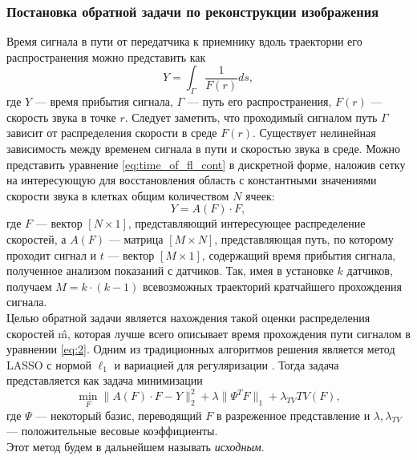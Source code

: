 \documentclass[14pt]{matmex-diploma-custom}
\begin{document}
\subsubsection*{Постановка обратной задачи по реконструкции изображения}
Время сигнала в пути от передатчика к приемнику вдоль траектории его распространения можно представить как
\begin{equation}\label{eq:time_of_fl_cont}
Y = \int_\Gamma \frac{1}{F(r)}ds,
\end{equation}
где $Y$ --- время прибытия сигнала, $\Gamma$ --- путь его распространения, $F(r)$ --- скорость звука в точке $r$. Следует заметить, что проходимый сигналом путь $\Gamma$ зависит от распределения скорости в среде $F(r)$. Существует нелинейная зависимость между временем сигнала в пути и скоростью звука в среде. Можно представить уравнение \eqref{eq:time_of_fl_cont} в дискретной форме, наложив сетку на интересующую для восстановления область с константными значениями скорости звука в клетках общим количеством $N$ ячеек:
\begin{equation}\label{eq:2}
Y = A(F)\cdot F,
\end{equation}
где $F$ --- вектор $[N\times 1]$, представляющий интересующее распределение скоростей, а $A(F)$ --- матрица $[M\times N]$, представляющая путь, по которому проходит сигнал и $t$ --- вектор $[M\times 1]$, содержащий время прибытия сигнала, полученное анализом показаний с датчиков. Так, имея в установке $k$ датчиков, получаем $M = k\cdot (k-1)$ всевозможных траекторий кратчайшего прохождения сигнала. \\

Целью обратной задачи является нахождения такой оценки распределения скоростей \^{m}, которая лучше всего описывает время прохождения пути сигналом в уравнении \eqref{eq:2}. Одним из традиционных алгоритмов решения является метод LASSO с нормой $\ell_1$ и вариацией для регуляризации \cite{hormati2010robust}. Тогда задача представляется как задача минимизации
\begin{equation}
\label{eq:lasso}
\min_F \| A(F) \cdot F - Y \|_2^2 + \lambda \| \Psi^T F \|_1 + \lambda_{TV} TV(F),
\end{equation}
где $\Psi$ --- некоторый базис, переводящий $F$ в разреженное представление и $\lambda, \lambda_{TV}$  --- положительные весовые коэффициенты. \\
Этот метод будем в дальнейшем называть \textit{исходным}.
\end{document}
